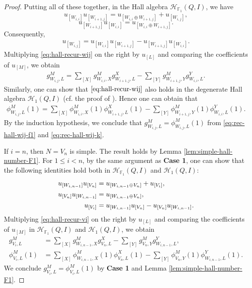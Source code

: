 \documentclass[12pt]{amsart}
\theoremstyle{remark}
\theoremstyle{definition}
\numberwithin{equation}{section}
\begin{document}
\begin{proof}
Putting all of these together, in the Hall algebra $\mathcal{H}_{\mathbb{F}_1}(Q,I)$, we have
\[
u_{[W_{i,i}]}u_{[W_{i+1,j}]}=u_{[W_{i,i}\oplus W_{i+1,j}]}+u_{[W_{i,j}]}, 
\]
\[
u_{[W_{i+1,j}]}u_{[W_{i,i}]}=u_{[W_{i,i}\oplus W_{i+1,j}]}.   
\]
Consequently,
\begin{align}\label{eq:hall-recur-wij}
u_{[W_{i,j}]}=u_{[W_{i,i}]}u_{[W_{i+1,j}]}-u_{[W_{i+1,j}]}u_{[W_{i,i}]}.
\end{align}
Multiplying \eqref{eq:hall-recur-wij} on the right by $u_{[L]}$ and comparing the coefficients of $u_{[M]}$, we obtain
\begin{align}\label{eq:rec-hall-wij-f1}
g^{M}_{W_{i,j},L}
=
\sum_{[X]}g^{M}_{W_{i,i},X}g^{X}_{W_{i+1,j},L}
-
\sum_{[Y]}g^{M}_{W_{i+1,j},Y}g^{Y}_{W_{i,i},L}.  
\end{align}
Similarly, one can show that $\eqref{eq:hall-recur-wij}$ also holds in the degenerate Hall algebra $\mathcal{H}_1(Q,I)$ (cf. the proof of \cite[Theorem 3.1]{CY24}). Hence one can obtain that 
\begin{align}\label{eq:rec-hall-wij-k}
\phi^{M}_{W_{i,j},L}(1)
=
\sum_{[X]}\phi^{M}_{W_{i,i},X}(1)\phi^{X}_{W_{i+1,j},L}(1)
-
\sum_{[Y]}\phi^{M}_{W_{i+1,j},Y}(1)\phi^{Y}_{W_{i,i},L}(1).  
\end{align}
By the induction hypothesis, we conclude that $g_{W_{i,j},L}^M=\phi_{W_{i,j},L}^M(1)$ from \eqref{eq:rec-hall-wij-f1} and \eqref{eq:rec-hall-wij-k}.



If  $i=n$, then $N=V_n$ is simple. The result holds by Lemma \ref{lem:simple-hall-number-F1}.
  For $1\leq i< n$, by the same argument as {\bf Case 1}, one can show that the following identities hold both in $\mathcal{H}_{\mathbb{F}_1}(Q,I)$ and $\mathcal{H}_1(Q,I)$:
\begin{align}
    u_{[W_{i,n-1}]}u_{[V_n]}&=u_{[W_{i,n-1}\oplus V_n]}+u_{[V_i]},\notag\\
     u_{[V_n]}u_{[W_{i,n-1}]}&=u_{[W_{i,n-1}\oplus V_n]},\notag\\
     u_{[V_i]}&=u_{[W_{i,n-1}]}u_{[V_n]}-u_{[V_n]}u_{[W_{i,n-1}]}.  \label{eq:hall-recur-vi}
\end{align}
Multiplying \eqref{eq:hall-recur-vi} on the right by $u_{[L]}$ and comparing the coefficients of $u_{[M]}$ in  $\mathcal{H}_{\mathbb{F}_1}(Q,I)$ and $\mathcal{H}_1(Q,I)$, we obtain
\begin{align*}
    g^{M}_{V_i,L}
&=
\sum_{[X]}g^{M}_{W_{i,n-1},X}g^{X}_{V_n,L}
-
\sum_{[Y]}g^{M}_{V_n,Y}g^{Y}_{W_{i,n-1},L},\\
\phi^{M}_{V_i,L}(1)
&=
\sum_{[X]}\phi^{M}_{W_{i,n-1},X}(1)\phi^{X}_{V_n,L}(1)
-
\sum_{[Y]}\phi^{M}_{V_n,Y}(1)\phi^{Y}_{W_{i,n-1},L}(1).
\end{align*}
We conclude $g_{V_i,L}^M=\phi_{V_i,L}^M(1)$ by {\bf Case 1} and Lemma \ref{lem:simple-hall-number-F1}.


\end{proof}
\end{document}
